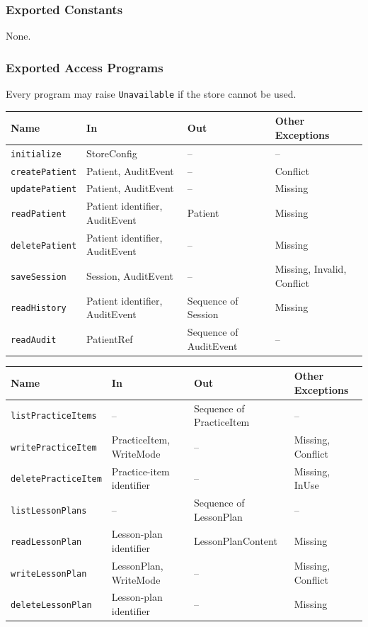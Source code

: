 \documentclass[12pt, titlepage]{article}
\begin{document}
\subsubsection{Exported Constants}
None.

\subsubsection{Exported Access Programs}
Every program may raise \texttt{Unavailable} if the store cannot be used.

\noindent\begin{tabularx}{\textwidth}{@{}l L L L@{}}
\toprule
\textbf{Name} & \textbf{In} & \textbf{Out} & \textbf{Other Exceptions}\\
\midrule
\texttt{initialize} & StoreConfig & -- & --\\
\texttt{createPatient} & Patient, AuditEvent & -- & Conflict\\
\texttt{updatePatient} & Patient, AuditEvent & -- & Missing\\
\texttt{readPatient} & Patient identifier, AuditEvent & Patient & Missing\\
\texttt{deletePatient} & Patient identifier, AuditEvent & -- & Missing\\
\texttt{saveSession} & Session, AuditEvent & -- & Missing, Invalid, Conflict\\
\texttt{readHistory} & Patient identifier, AuditEvent & Sequence of Session &
Missing\\
\texttt{readAudit} & PatientRef & Sequence of AuditEvent & --\\
\bottomrule
\end{tabularx}

\medskip
\noindent\begin{tabularx}{\textwidth}{@{}l L L L@{}}
\toprule
\textbf{Name} & \textbf{In} & \textbf{Out} & \textbf{Other Exceptions}\\
\midrule
\texttt{listPracticeItems} & -- & Sequence of PracticeItem & --\\
\texttt{writePracticeItem} & PracticeItem, WriteMode & -- & Missing, Conflict\\
\texttt{deletePracticeItem} & Practice-item identifier & -- & Missing, InUse\\
\texttt{listLessonPlans} & -- & Sequence of LessonPlan & --\\
\texttt{readLessonPlan} & Lesson-plan identifier & LessonPlanContent & Missing\\
\texttt{writeLessonPlan} & LessonPlan, WriteMode & -- & Missing, Conflict\\
\texttt{deleteLessonPlan} & Lesson-plan identifier & -- & Missing\\
\bottomrule
\end{tabularx}
\end{document}

